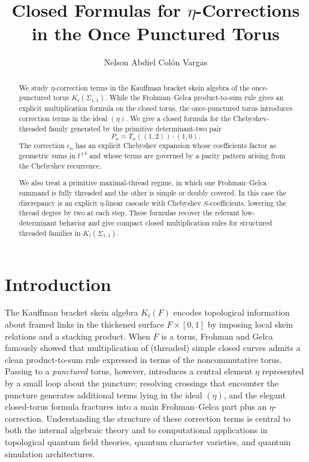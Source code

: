 \documentclass[12pt]{article}
\title{Closed Formulas for $\eta$-Corrections in the Once Punctured Torus}
\author{Nelson Abdiel Col\'on Vargas \orcidlink{0009-0009-9038-7328}}
\affil{North Carolina State University \\ \texttt{nacolonv@ncsu.edu}}
\affil{University of Cambridge}
\date{}
\begin{document}
\maketitle


\begin{abstract}
We study $\eta$-correction terms in the Kauffman bracket skein algebra of the once-punctured torus $K_t(\Sigma_{1,1})$. While the Frohman--Gelca product-to-sum rule gives an explicit multiplication formula on the closed torus, the once-punctured torus introduces correction terms in the ideal $(\eta)$. We give a closed formula for the Chebyshev-threaded family generated by the primitive determinant-two pair
\[
P_n=T_n((1,2))\cdot(1,0).
\]
The correction $\epsilon_n$ has an explicit Chebyshev expansion whose coefficients factor as geometric sums in $t^{\pm4}$ and whose terms are governed by a parity pattern arising from the Chebyshev recurrence.

We also treat a primitive maximal-thread regime, in which one Frohman--Gelca summand is fully threaded and the other is simple or doubly covered. In this case the discrepancy is an explicit $\eta$-linear cascade with Chebyshev $S$-coefficients, lowering the thread degree by two at each step. These formulas recover the relevant low-determinant behavior and give compact closed multiplication rules for structured threaded families in $K_t(\Sigma_{1,1})$.
\end{abstract}








\section{Introduction}

The Kauffman bracket skein algebra $K_t(F)$ encodes topological information about framed links in the thickened surface $F\times[0,1]$ by imposing local skein relations and a stacking product. When $F$ is a torus, Frohman and Gelca \cite{frohmangelca} famously showed that multiplication of (threaded) simple closed curves admits a clean product-to-sum rule expressed in terms of the noncommutative torus. Passing to a \emph{punctured} torus, however, introduces a central element $\eta$ represented by a small loop about the puncture; resolving crossings that encounter the puncture generates additional terms lying in the ideal $(\eta)$, and the elegant closed-torus formula fractures into a main Frohman--Gelca part plus an $\eta$-correction. 
Understanding the structure of these correction terms is central to both the internal algebraic theory and to computational applications in topological quantum field theories, quantum character varieties, and quantum simulation architectures.
\end{document}
